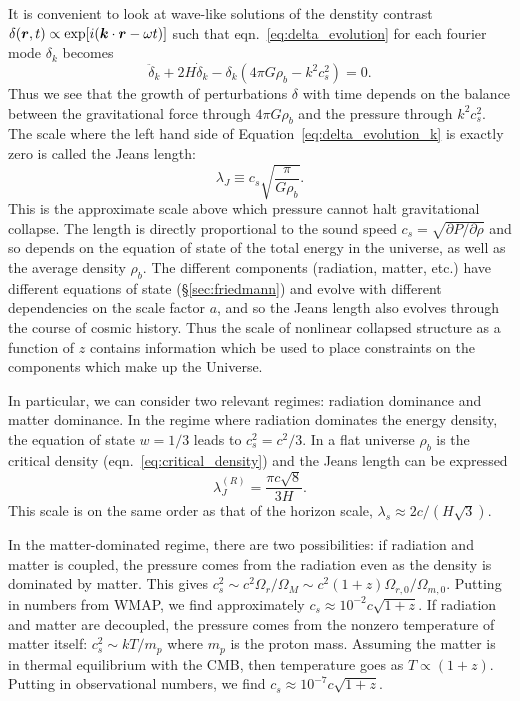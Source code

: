 It is convenient to look at wave-like solutions of the denstity contrast
$\delta(\boldsymbol{r}, t) \propto \exp[i(\boldsymbol{k}\cdot\boldsymbol{r} - \omega t)]$
such that eqn.~\ref{eq:delta_evolution} for each fourier mode $\delta_k$
becomes
\begin{equation}
  \label{eq:delta_evolution_k}
  \ddot{\delta}_k + 2 H \dot{\delta}_k - \delta_k(4\pi G\rho_b - k^2c_s^2) = 0.
\end{equation}
Thus we see that the growth of perturbations $\delta$ with time depends
on the balance between the gravitational force through $4\pi G\rho_b$ and the
pressure through $k^2c_s^2$.  The scale where the left hand side of
Equation~\ref{eq:delta_evolution_k} is exactly zero is called the Jeans
length:
\begin{equation}
  \label{eq:jeans_length}
  \lambda_J \equiv c_s \sqrt{\frac{\pi}{G\rho_b}}.
\end{equation}
This is the approximate scale above which pressure cannot halt gravitational
collapse.  The length is directly proportional to the sound speed
$c_s = \sqrt{\partial P/\partial \rho}$ and so depends on the equation of
state of the total energy in the universe,
as well as the average density $\rho_b$.
The different components (radiation, matter, etc.) have different
equations of state (\S\ref{sec:friedmann}) and evolve
with different dependencies on the scale factor
$a$, and so the Jeans length also evolves through the course of cosmic
history.  Thus the scale of nonlinear
collapsed structure as a function of $z$ contains information which
be used to place constraints on the components which make up the Universe.

In particular, we can consider two relevant regimes: radiation dominance
and matter dominance.  In the regime where radiation dominates the energy
density, the equation of state $w=1/3$ leads to $c_s^2 = c^2/3$.  In a flat
universe $\rho_b$ is the critical density (eqn.~\ref{eq:critical_density})
and the Jeans length can be expressed
\begin{equation}
  \label{eq:jeans_radiation}
  \lambda_J^{(R)} = \frac{\pi c \sqrt{8}}{3 H}.
\end{equation}
This scale is on the same order as that of the horizon scale,
$\lambda_s \approx 2c / (H\sqrt{3})$.

In the matter-dominated regime, there are two possibilities: if radiation and
matter is coupled, the pressure comes from the radiation
even as the density is dominated by matter.  This gives
$c_s^2 \sim c^2 \Omega_r / \Omega_M \sim c^2 (1 + z) \Omega_{r,0}/\Omega_{m, 0}$.
Putting in numbers from WMAP, we find approximately
$c_s \approx 10^{-2} c \sqrt{1 + z}$.
If radiation and matter are decoupled, the pressure comes from the nonzero
temperature of matter itself:
$c_s^2 \sim kT/m_p$ where $m_p$ is the proton mass.  Assuming the matter
is in thermal equilibrium with the CMB, then temperature goes as
$T \propto (1 + z)$.  Putting in observational numbers, we find
$c_s \approx 10^{-7} c \sqrt{1 + z}$.

